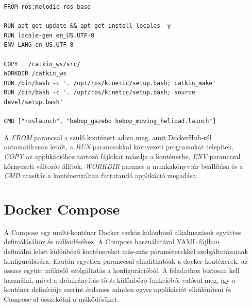 \begin{minipage}{\linewidth}
\begin{lstlisting}[caption={Példa alap robotoperációsrendszer konténerizációjához}, label={lst:dockerexample}]
FROM ros:melodic-ros-base

RUN apt-get update && apt-get install locales -y
RUN locale-gen en_US.UTF-8
ENV LANG en_US.UTF-8

COPY . /catkin_ws/src/
WORKDIR /catkin_ws
RUN /bin/bash -c '. /opt/ros/kinetic/setup.bash; catkin_make'
RUN /bin/bash -c '. /opt/ros/kinetic/setup.bash; source devel/setup.bash'

CMD ["roslaunch", "bebop_gazebo bebop_moving_helipad.launch"]
\end{lstlisting}
\end{minipage}
A \emph{FROM} parancsal a szülő konténert adom meg, amit DockerHub-ról automatikusan letölt, a \emph{RUN} parancsokkal környezeti programokat telepítek, \emph{COPY} az applikációhoz tartozó fájlokat másolja a konténerbe, \emph{ENV} paranccsal környezeti változót állítok, \emph{WORKDIR} parancs a munkakönyvtár beállítása és a \emph{CMD} utasítás a konténerizáltan futtatandó applikáció megadása.

\section{Docker Compose}
A Compose egy multi-konténer Docker eszköz különböző alkalmazások együttes definiálásához és működéséhez. A Compose használatával YAML fájlban definiálni lehet különböző konténereket más-más paraméterekkel szolgáltatásainak konfigurálására. Ezután egyetlen paranccsal elindíthatóak a docker konténerek, az összes együtt működő szolgáltatás a konfigurációból. \cite{compose} A feladathoz biztosan kell használni, mivel a drónirányítás több különböző funkcióból valósul meg, így a konténer definíciója szerint érdemes minden egyes applikációt elkülöníteni és Compose-al összekötni a működésüket.

